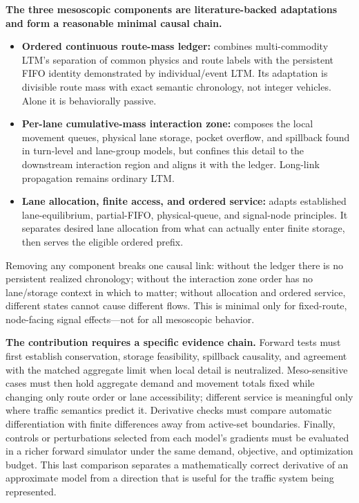 \documentclass[10pt,a4paper]{article}
\begin{document}
\textbf{The three mesoscopic components are literature-backed adaptations and form a reasonable minimal causal chain.}

\begin{itemize}
  \item \textbf{Ordered continuous route-mass ledger:} combines multi-commodity LTM's separation of common physics and route labels with the persistent FIFO identity demonstrated by individual/event LTM. Its adaptation is divisible route mass with exact semantic chronology, not integer vehicles. Alone it is behaviorally passive.
  \item \textbf{Per-lane cumulative-mass interaction zone:} composes the local movement queues, physical lane storage, pocket overflow, and spillback found in turn-level and lane-group models, but confines this detail to the downstream interaction region and aligns it with the ledger. Long-link propagation remains ordinary LTM.
  \item \textbf{Lane allocation, finite access, and ordered service:} adapts established lane-equilibrium, partial-FIFO, physical-queue, and signal-node principles. It separates desired lane allocation from what can actually enter finite storage, then serves the eligible ordered prefix.
\end{itemize}

Removing any component breaks one causal link: without the ledger there is no persistent realized chronology; without the interaction zone order has no lane/storage context in which to matter; without allocation and ordered service, different states cannot cause different flows. This is minimal only for fixed-route, node-facing signal effects---not for all mesoscopic behavior.

\textbf{The contribution requires a specific evidence chain.} Forward tests must first establish conservation, storage feasibility, spillback causality, and agreement with the matched aggregate limit when local detail is neutralized. Meso-sensitive cases must then hold aggregate demand and movement totals fixed while changing only route order or lane accessibility; different service is meaningful only where traffic semantics predict it. Derivative checks must compare automatic differentiation with finite differences away from active-set boundaries. Finally, controls or perturbations selected from each model's gradients must be evaluated in a richer forward simulator under the same demand, objective, and optimization budget. This last comparison separates a mathematically correct derivative of an approximate model from a direction that is useful for the traffic system being represented.
\end{document}
